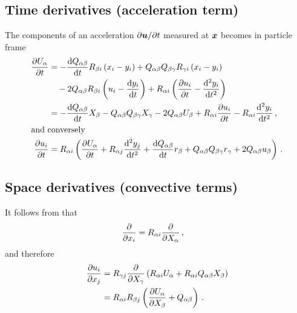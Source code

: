\documentclass[thesis.tex]{subfiles}
\begin{document}
\subsection{Time derivatives (acceleration term)}
The components of an acceleration $\partial \mbox{\boldmath$u$}/\partial t$ measured at $\mbox{\boldmath$x$}$ becomes in particle frame
\begin{align}
    \pdiff{U_\alpha}{t} &= -\diff{Q_{\alpha \beta}}{t}R_{\beta i}\left(x_i - y_i\right) + Q_{\alpha \beta}Q_{\beta \gamma}R_{\gamma i}\left(x_i - y_i\right) \nn\\
    &\quad- 2Q_{\alpha \beta}R_{\beta i}\left(u_i - \diff{y_i}{t}\right) + R_{\alpha i}\left(\pdiff{u_i}{t} - \frac{\rd^2 y_i}{\rd t^2}\right) \nn \\
    &= -\diff{Q_{\alpha \beta}}{t}X_\beta - Q_{\alpha \beta}Q_{\beta \gamma}X_\gamma - 2Q_{\alpha \beta}U_\beta + R_{\alpha i}\pdiff{u_i}{t} -R_{\alpha i}\frac{\rd^2 y_i}{\rd t^2}\,,\\
    \intertext{and conversely}
    \pdiff{u_i}{t} &= R_{\alpha i}\left(\pdiff{U_\alpha}{t} + R_{\alpha j}\frac{\rd^2y_j}{\rd t^2} + \diff{Q_{\alpha \beta}}{t}r_\beta + Q_{\alpha \beta}Q_{\beta \gamma}r_\gamma + 2Q_{\alpha \beta}u_\beta \right)\,.
    \eqnlab{partialu}
\end{align}
\subsection{Space derivatives (convective terms)}
It follows from  that
\begin{align}
 	\frac{\partial }{\partial x_i} &= R_{\alpha i}\frac{\partial }{\partial X_\alpha}\,, 
 \end{align} 
 and therefore
 \begin{align}
 	\pdiff{u_i}{x_j} &= R_{\gamma j}\pdiff{}{X_\gamma}\left(R_{\alpha i}U_\alpha + R_{\alpha i}Q_{\alpha \beta}X_\beta\right) \nn\\
 	&= R_{\alpha i}R_{\beta j}\left(\pdiff{U_\alpha}{X_\beta}+Q_{\alpha \beta}\right)\,.\eqnlab{dudx}
 \end{align}
\end{document}
